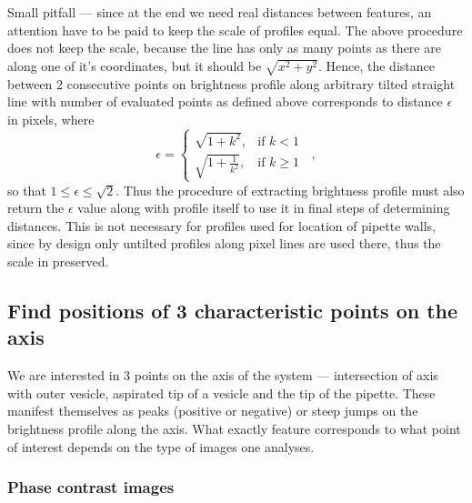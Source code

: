 Small pitfall --- since at the end we need real distances between features, an attention have to be paid to keep the scale of profiles equal. The above procedure does not keep the scale, because the line has only as many points as there are along one of it's coordinates, but it should be $\sqrt{x^2+y^2}$. Hence, the distance between 2 consecutive points on brightness profile along arbitrary tilted straight line with number of evaluated points as defined above corresponds to distance $\epsilon$ in pixels, where
\begin{equation}
\epsilon = \left\{
\begin{array}{ll}
	\sqrt{1+k^2},&\text{if }k < 1\\
	\sqrt{1+\frac{1}{k^2}},&\text{if } k \geq 1 
\end{array}
\right.\;\;,
\label{eq:profilescale}
\end{equation}
so that $1 \leq \epsilon \leq \sqrt{2}$. Thus the procedure of extracting brightness profile must also return the $\epsilon$ value along with profile itself to use it in final steps of determining distances. This is not necessary for profiles used for location of pipette walls, since by design only untilted profiles along pixel lines are used there, thus the scale in preserved.

\subsection{Find positions of 3 characteristic points on the axis}\label{points}

We are interested in 3 points on the axis of the system --- intersection of axis with outer vesicle, aspirated tip of a vesicle and the tip of the pipette. These manifest themselves as peaks (positive or negative) or steep jumps on the brightness profile along the axis. What exactly feature corresponds to what point of interest depends on the type of images one analyses.

\subsubsection{Phase contrast images}\label{phcfeatures}

